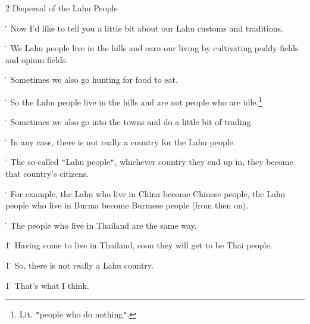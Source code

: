 
2 Dispersal of the Lahu People

\. Now I'd like to tell you a little bit about our Lahu customs and traditions.

\. We Lahu people live in the hills and earn our living by cultivating paddy fields
and opium fields.

\. Sometimes we also go hunting for food to eat.

\. So the Lahu people live in the hills and are not people who are idle.\footnote{Lit. \texttt{"}people who do nothing\texttt{"}.}

\. Sometimes we also go into the towns and do a little bit of trading.

\. In any case, there is not really a country for the Lahu people.

\. The so-called \texttt{"}Lahu people\texttt{"}, whichever country they end up
in, they become that country's citizens.

\. For example, the Lahu who live in China become Chinese people, the Lahu people
who live in Burma become Burmese people (from then on).

\. The people who live in Thailand are the same way.

1\. Having come to live in Thailand, soon they will get to be Thai people.

1\. So, there is not really a Lahu country.

1\. That's what I think.

